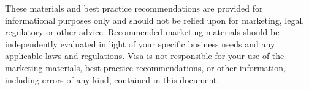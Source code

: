 \documentclass[11pt]{article}
\begin{document}
These materials and best practice recommendations are provided for informational purposes only and should not be relied upon for marketing, legal, regulatory or other advice. Recommended marketing materials should be independently evaluated in light of your specific business needs and any applicable laws and regulations. Visa is not responsible for your use of the marketing materials, best practice recommendations, or other information, including errors of any kind, contained in this document.
\fi
\end{document}

